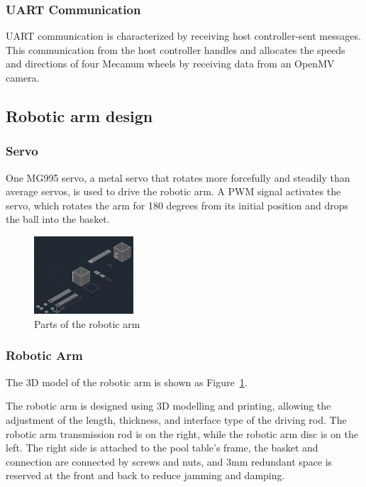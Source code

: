 \documentclass{article}
\begin{document}
        \subsubsection{UART Communication}
        UART communication is characterized by receiving host controller-sent messages. This communication from the host controller handles and allocates the speeds and directions of four Mecanum wheels by receiving data from an OpenMV camera.
    
    \subsection{Robotic arm design}
    
        \subsubsection{Servo}
        One MG995 servo, a metal servo that rotates more forcefully and steadily than average servos, is used to drive the robotic arm. A PWM signal activates the servo, which rotates the arm for 180 degrees from its initial position and drops the ball into the basket.
        
        \begin{figure}
            \includegraphics[width=0.33\textwidth]{figure/3dprint.png}
          \caption{Parts of the robotic arm}
          \label{3d}
        \end{figure}
        
        \subsubsection{Robotic Arm}
        
        The 3D model of the robotic arm is shown as Figure~\ref{3d}.
        
        The robotic arm is designed using 3D modelling and printing, allowing the adjustment of the length, thickness, and interface type of the driving rod. The robotic arm transmission rod is on the right, while the robotic arm disc is on the left. The right side is attached to the pool table's frame, the basket and connection are connected by screws and nuts, and 3mm redundant space is reserved at the front and back to reduce jamming and damping.
        
\end{document}
